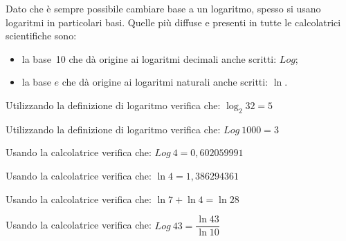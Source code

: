 \noindent
Dato che è sempre possibile cambiare base a un logaritmo, spesso si 
usano logaritmi in particolari basi. Quelle più diffuse e presenti in tutte 
le calcolatrici scientifiche sono: 
\begin{itemize}
 \item 
la base~10 che dà origine ai logaritmi decimali anche scritti: \(Log\);
 \item 
la base \(e\) che dà origine ai logaritmi naturali anche scritti: \(\ln\).
\end{itemize}

\begin{esempio}
 Utilizzando la definizione di logaritmo verifica che: \(\log_2 32 = 5\)
\end{esempio}

\begin{esempio}
 Utilizzando la definizione di logaritmo verifica che: \(Log~1000 = 3\)
\end{esempio}

\begin{esempio}
 Usando la calcolatrice verifica che: \(Log~4 = 0,602059991\)
\end{esempio}

\begin{esempio}
 Usando la calcolatrice verifica che: \(\ln 4 = 1,386294361\)
\end{esempio}

\begin{esempio}
 Usando la calcolatrice verifica che: \(\ln 7 + \ln 4 = \ln 28\)
\end{esempio}

\begin{esempio}
 Usando la calcolatrice verifica che: \(Log~43 = \dfrac{\ln 43}{\ln 10}\)
\end{esempio}

